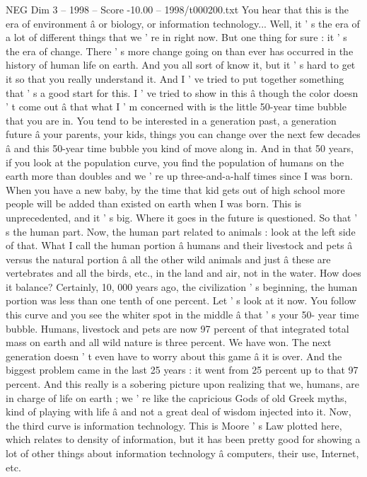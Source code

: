 \begin{textsample}{NEG Dim 3 – 1998 – Score -10.00 – 1998/t000200.txt}  \label{ex:f3_neg_002}
You hear that this is the era of environment â or biology, or information technology...
Well, it ' s the era of a lot of different things that we ' re in right now.
But one thing for sure : it ' s the era of change.
There ' s more change going on than ever has occurred in the history of human life on earth.
And you all sort of know it, but it ' s hard to get it so that you really understand it.
And I ' ve tried to put together something that ' s a good start for this.
I ' ve tried to show in this â though the color doesn ' t come out â that what I ' m concerned with is the little 50-year time bubble that you are in.
You tend to be interested in a generation past, a generation future â your parents, your kids, things you can change over the next few decades â and this 50-year time bubble you kind of move along in.
And in that 50 years, if you look at the population curve, you find the population of humans on the earth more than doubles and we ' re up three-and-a-half times since I was born.
When you have a new baby, by the time that kid gets out of high school more people will be added than existed on earth when I was born.
This is unprecedented, and it ' s big.
Where it goes in the future is questioned.
So that ' s the human part.
Now, the human part related to animals : look at the left side of that.
What I call the human portion â humans and their livestock and pets â versus the natural portion â all the other wild animals and just â these are vertebrates and all the birds, etc., in the land and air, not in the water.
How does it balance?
Certainly, 10, 000 years ago, the civilization ' s beginning, the human portion was less than one tenth of one percent.
Let ' s look at it now.
You follow this curve and you see the whiter spot in the middle â that ' s your 50- year time bubble.
Humans, livestock and pets are now 97 percent of that integrated total mass on earth and all wild nature is three percent.
We have won.
The next generation doesn ' t even have to worry about this game â it is over.
And the biggest problem came in the last 25 years : it went from 25 percent up to that 97 percent.
And this really is a sobering picture upon realizing that we, humans, are in charge of life on earth ; we ' re like the capricious Gods of old Greek myths, kind of playing with life â and not a great deal of wisdom injected into it.
Now, the third curve is information technology.
This is Moore ' s Law plotted here, which relates to density of information, but it has been pretty good for showing a lot of other things about information technology â computers, their use, Internet, etc.

\end{textsample}
